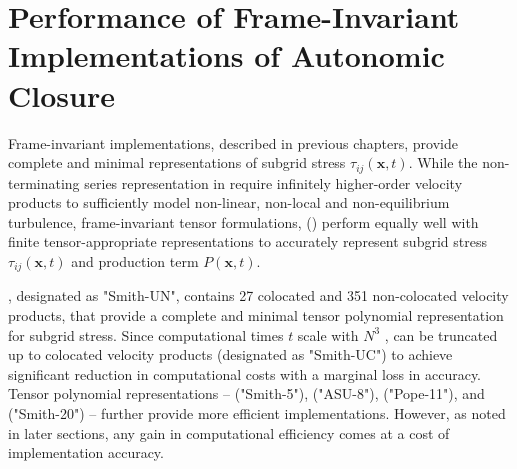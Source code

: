 \graphicspath{ {./Ch10/}  } 

%





%


\chapter{Performance of Frame-Invariant Implementations of Autonomic Closure}
\label{ch:10}



% 
Frame-invariant implementations, described in previous chapters, 
	provide complete and minimal representations
of subgrid stress $\tau_{ij}(\mathbf{x},t)$.
%
While the non-terminating series representation in   
require infinitely higher-order velocity products 
		to sufficiently model non-linear, non-local and non-equilibrium turbulence,
frame-invariant tensor formulations, 
		() 
perform equally well with finite tensor-appropriate representations
to accurately represent 
	subgrid stress $\tau_{ij}(\mathbf{x},t)$ 
	and production term $P(\mathbf{x},t)$.  

%
, 
designated as "Smith-UN", 
	contains 27 colocated 
	and 351 non-colocated velocity products, 
that provide a complete and minimal tensor polynomial representation 
for subgrid stress. 
%
Since computational times $t$ scale with $N^3$ ,
%
	 can be truncated up to colocated velocity products 
(designated as "Smith-UC") 
	to achieve significant reduction in computational costs
		with a marginal loss in accuracy. 
%
Tensor polynomial representations -- 
	 ("Smith-5"), 
	 ("ASU-8"), 
	 ("Pope-11"), and 
	 ("Smith-20") --
further provide more efficient implementations.
%
%
However, as noted in later sections,		
any gain in computational efficiency 
comes at a cost of implementation accuracy.
	  

